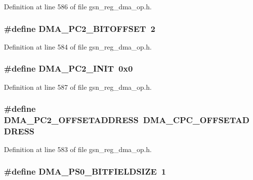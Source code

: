 Definition at line 586 of file gsn\_\-reg\_\-dma\_\-op.h.

\hypertarget{a00547_aaaf484ef479d07ffcb985d91abc294b8}{
\subsubsection[{DMA\_\-PC2\_\-BITOFFSET}]{\setlength{\rightskip}{0pt plus 5cm}\#define DMA\_\-PC2\_\-BITOFFSET~2}}
\label{a00547_aaaf484ef479d07ffcb985d91abc294b8}


Definition at line 584 of file gsn\_\-reg\_\-dma\_\-op.h.

\hypertarget{a00547_ae8f8f5cafa7cb5a3432330f6bd7c8545}{
\subsubsection[{DMA\_\-PC2\_\-INIT}]{\setlength{\rightskip}{0pt plus 5cm}\#define DMA\_\-PC2\_\-INIT~0x0}}
\label{a00547_ae8f8f5cafa7cb5a3432330f6bd7c8545}


Definition at line 587 of file gsn\_\-reg\_\-dma\_\-op.h.

\hypertarget{a00547_aed95caeafb0768984755ed3f1ab4a356}{
\subsubsection[{DMA\_\-PC2\_\-OFFSETADDRESS}]{\setlength{\rightskip}{0pt plus 5cm}\#define DMA\_\-PC2\_\-OFFSETADDRESS~DMA\_\-CPC\_\-OFFSETADDRESS}}
\label{a00547_aed95caeafb0768984755ed3f1ab4a356}


Definition at line 583 of file gsn\_\-reg\_\-dma\_\-op.h.

\hypertarget{a00547_a9c92e09941478b3ffe3b570d8c4bfcef}{
\subsubsection[{DMA\_\-PS0\_\-BITFIELDSIZE}]{\setlength{\rightskip}{0pt plus 5cm}\#define DMA\_\-PS0\_\-BITFIELDSIZE~1}}
\label{a00547_a9c92e09941478b3ffe3b570d8c4bfcef}


